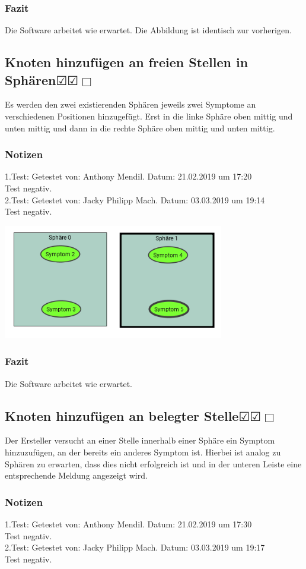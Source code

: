 \documentclass[enabledeprecatedfontcommands]{scrartcl}
\newcommand{\subsectiont}[2]{\subsection[#1]{#1{\normalsize\normalfont #2}}}
\newcommand{\leer}{$\Box$}
\newcommand{\ok}{$\CheckedBox$}
\begin{document}
\subsubsection{Fazit}
Die Software arbeitet wie erwartet. Die Abbildung ist identisch zur vorherigen.

\subsectiont{Knoten hinzufügen an freien Stellen in Sphären}{\dotfill\ok\ok\leer}
Es werden den zwei existierenden Sphären jeweils zwei Symptome an verschiedenen Positionen hinzugefügt. Erst in die linke Sphäre oben mittig und unten mittig und dann in die rechte Sphäre oben mittig und unten mittig.  
\subsubsection{Notizen}
1.Test: Getestet von: Anthony Mendil. Datum: 21.02.2019 um 17:20 \\
Test negativ.\\
2.Test: Getestet von: Jacky Philipp Mach. Datum: 03.03.2019 um 19:14 \\
Test negativ.
\begin{center}
\includegraphics[height=5cm]{1_3.PNG}
\end{center}
\subsubsection{Fazit}
Die Software arbeitet wie erwartet.

\subsectiont{Knoten hinzufügen an belegter Stelle}{\dotfill\ok\ok\leer}
Der Ersteller versucht an einer Stelle innerhalb einer Sphäre ein Symptom hinzuzufügen, an der bereits ein anderes Symptom ist. Hierbei ist analog zu Sphären zu erwarten, dass dies nicht erfolgreich ist und in der unteren Leiste eine entsprechende Meldung angezeigt wird.
\subsubsection{Notizen}
1.Test: Getestet von: Anthony Mendil. Datum: 21.02.2019 um 17:30 \\
Test negativ.\\
2.Test: Getestet von: Jacky Philipp Mach. Datum: 03.03.2019 um 19:17 \\
Test negativ.
\end{document}
